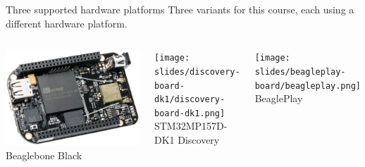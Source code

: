 \begin{frame}{Three supported hardware platforms}
  Three variants for this course, each using a different hardware
  platform.  \vfill
  \begin{columns}
    \begin{center}
      \includegraphics[height=0.4\textheight]{slides/beagleboneblack-board/beagleboneblack.png}
      \newline
      Beaglebone Black
    \end{center}
    \begin{center}
      \texttt{[image: slides/discovery-board-dk1/discovery-board-dk1.png]}
      \newline
      STM32MP157D-DK1 Discovery
    \end{center}
    \begin{center}
      \texttt{[image: slides/beagleplay-board/beagleplay.png]}
      \newline
      BeaglePlay
    \end{center}
  \end{columns}
\end{frame}

